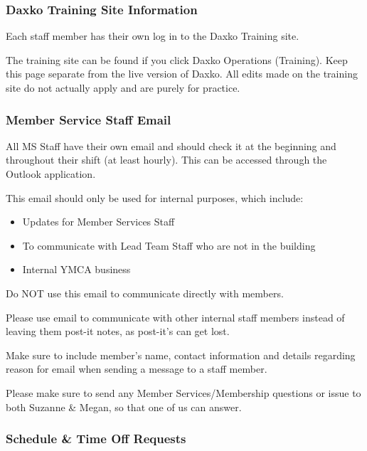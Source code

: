 \documentclass[
]{report}
\providecommand{\tightlist}{%
  \setlength{\itemsep}{0pt}\setlength{\parskip}{0pt}}\usepackage{longtable,booktabs,array}
\begin{document}
\hypertarget{daxko-training-site-information}{%
\subsubsection{Daxko Training Site
Information}\label{daxko-training-site-information}}

Each staff member has their own log in to the Daxko Training site.

The training site can be found if you click Daxko Operations (Training).
Keep this page separate from the live version of Daxko. All edits made
on the training site do not actually apply and are purely for practice.

\hypertarget{member-service-staff-email}{%
\subsubsection{Member Service Staff
Email}\label{member-service-staff-email}}

All MS Staff have their own email and should check it at the beginning
and throughout their shift (at least hourly). This can be accessed
through the Outlook application.

This email should only be used for internal purposes, which include:

\begin{itemize}
\tightlist
\item
  Updates for Member Services Staff
\item
  To communicate with Lead Team Staff who are not in the building
\item
  Internal YMCA business
\end{itemize}

Do NOT use this email to communicate directly with members.

Please use email to communicate with other internal staff members
instead of leaving them post-it notes, as post-it's can get lost.

Make sure to include member's name, contact information and details
regarding reason for email when sending a message to a staff member.

Please make sure to send any Member Services/Membership questions or
issue to both Suzanne \& Megan, so that one of us can answer.

\hypertarget{schedule-time-off-requests}{%
\subsubsection{Schedule \& Time Off
Requests}\label{schedule-time-off-requests}}
\end{document}
